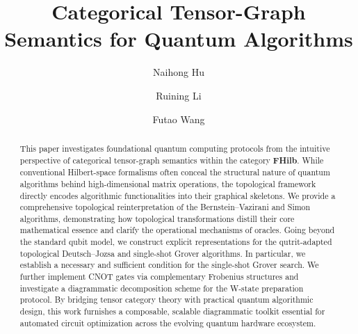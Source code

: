 \documentclass[a4paper,twocolumn,11pt,unpublished]{quantumarticle}
\numberwithin{equation}{section}
\begin{document}
\title{Categorical Tensor-Graph Semantics for Quantum Algorithms }

\author{Naihong Hu}
\author{Ruining Li}
\author{Futao Wang}

\maketitle

\begin{abstract}
  
This paper investigates foundational quantum computing protocols from the intuitive perspective of categorical tensor-graph semantics within the category \textbf{FHilb}. While conventional Hilbert-space formalisms often conceal the structural nature of quantum algorithms behind high-dimensional matrix operations, the topological framework directly encodes algorithmic functionalities into their graphical skeletons. We provide a comprehensive topological reinterpretation of the Bernstein--Vazirani and Simon algorithms, demonstrating how topological transformations distill their core mathematical essence and clarify the operational mechanisms of oracles. Going beyond the standard qubit model, we construct explicit representations for the qutrit-adapted topological Deutsch--Jozsa and single-shot Grover algorithms. In particular, we establish a necessary and sufficient condition for the single-shot Grover search. We further implement CNOT gates via complementary Frobenius structures and investigate a diagrammatic decomposition scheme for the W-state preparation protocol. By bridging tensor category theory with practical quantum algorithmic design, this work furnishes a composable, scalable diagrammatic toolkit essential for automated circuit optimization across the evolving quantum hardware ecosystem.
\end{abstract}
\end{document}
